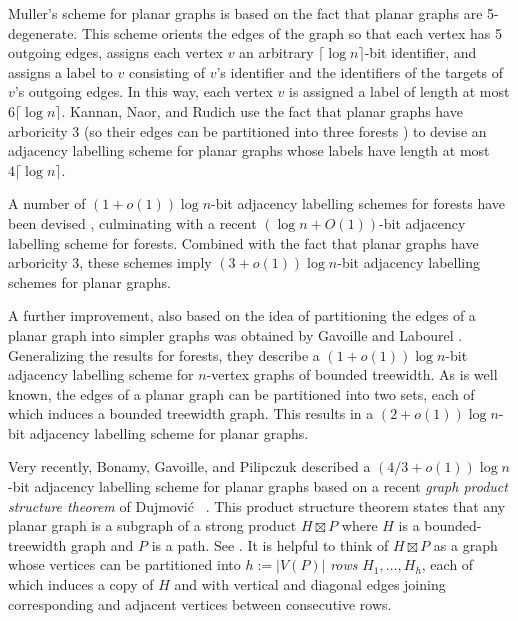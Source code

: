 \documentclass[kpfonts]{patmorin}
\newcommand{\snote}[1]{\fcolorbox{red}{yellow}{#1}}
\newcommand{\pnote}[1]{\ \newline\noindent\fcolorbox{red}{yellow}{\begin{minipage}{\textwidth}#1\end{minipage}}}
\begin{document}
Muller's scheme for planar graphs \cite{muller:local} is based on the fact that planar graphs are 5-degenerate.  This scheme orients the edges of the graph so that each vertex has 5 outgoing edges, assigns each vertex $v$ an arbitrary $\lceil\log n\rceil$-bit identifier, and assigns a label to $v$ consisting of $v$'s identifier and the identifiers of the targets of $v$'s outgoing edges.  In this way, each vertex $v$ is assigned a label of length at most $6\lceil\log n\rceil$.  Kannan, Naor, and Rudich \cite{kannan.naor.ea:implicit} use the fact that planar graphs have arboricity 3 (so their edges can be partitioned into three forests \cite{nash-williams:edge-disjoint}) to devise an adjacency labelling scheme for planar graphs whose labels have length at most $4\lceil\log n\rceil$.  

A number of $(1+o(1))\log n$-bit adjacency labelling schemes for forests have been devised \cite{chung:universal, alstrup.rauhe:improved,alstrup.dahlgaard.ea:optimal}, culminating with a recent $(\log n + O(1))$-bit adjacency labelling scheme \cite{alstrup.dahlgaard.ea:optimal} for forests.  Combined with the fact that planar graphs have arboricity 3, these schemes imply $(3+o(1))\log n$-bit adjacency labelling schemes for planar graphs.  

A further improvement, also based on the idea of partitioning the edges of a planar graph into simpler graphs was obtained by Gavoille and Labourel \cite{gavoille.labourel:shorter}.  Generalizing the results for forests, they describe a $(1+o(1))\log n$-bit adjacency labelling scheme for $n$-vertex graphs of bounded treewidth. As is well known, the edges of a planar graph can be partitioned into two sets, each of which induces a bounded treewidth graph. 
This results in a $(2+o(1))\log n$-bit adjacency labelling scheme for planar graphs.

Very recently, Bonamy, Gavoille, and Pilipczuk \cite{bonamy.gavoille.ea:shorter} described a $(4/3+o(1))\log n$-bit adjacency labelling scheme for planar graphs based on a recent \emph{graph product structure theorem} of Dujmović \etal\ \cite{dujmovic.joret.ea:planar}.  This product structure theorem states that any planar graph is a subgraph of a strong product $H\boxtimes P$ where $H$ is a bounded-treewidth graph and $P$ is a path. See . It is helpful to think of $H\boxtimes P$ as a graph whose vertices can be partitioned into $h:=|V(P)|$ \emph{rows} $H_1,\ldots,H_{h}$, each of which induces a copy of $H$ and with vertical and diagonal edges joining corresponding and adjacent vertices between consecutive rows.  
\end{document}
